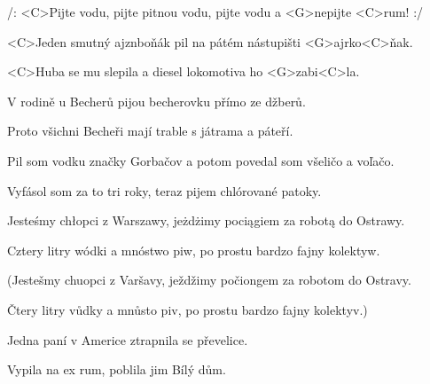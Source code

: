 
\zr
/: <C>Pijte vodu, pijte pitnou vodu, pijte vodu a <G>nepijte <C>rum! :/
\kr

\zs
<C>Jeden smutný ajznboňák pil na pátém nástupišti 
<G>ajrko<C>ňak.

<C>Huba se mu slepila a diesel lokomotiva ho <G>zabi<C>la.
\ks

\zr \kr

\zs
V rodině u Becherů pijou becherovku přímo ze džberů.

Proto všichni Becheři mají trable s játrama a páteří.
\ks

\zr \kr

\zs
Pil som vodku značky Gorbačov a potom povedal som všeličo a voľačo.

Vyfásol som za to tri roky, teraz pijem chlórované patoky.
\ks

\zr \kr

\zs
Jesteśmy chłopci z Warszawy, jeżdżimy pociągiem za robotą do Ostrawy.

Cztery litry wódki a mnóstwo piw, po prostu bardzo fajny kolektyw.

(Jestešmy chuopci z Varšavy, ježdžimy počiongem za robotom do Ostravy.

Čtery litry vůdky a mnůsto piv, po prostu bardzo fajny kolektyv.)

\ks

\zr \kr

\zs
Jedna paní v Americe ztrapnila se převelice.

Vypila na ex rum, poblila jim Bílý dům.
\ks

\zr \kr

\kp





